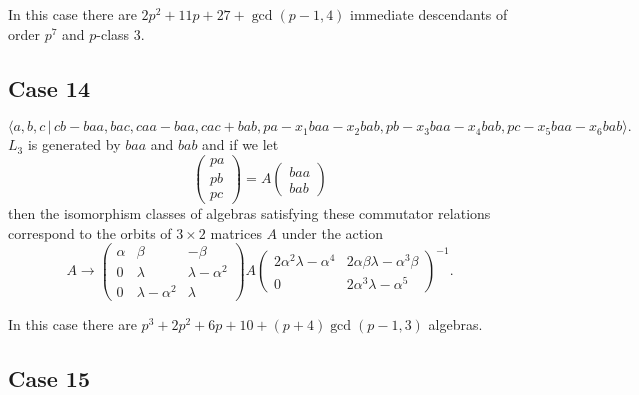 \documentclass[10pt,thmsa]{article}
\begin{document}
In this case there are $2p^{2}+11p+27+\gcd (p-1,4)$ immediate descendants of
order $p^{7}$ and $p$-class 3.

\subsection{Case 14}

\[
\langle
a,b,c\,|%
\,cb-baa,bac,caa-baa,cac+bab,pa-x_{1}baa-x_{2}bab,pb-x_{3}baa-x_{4}bab,pc-x_{5}baa-x_{6}bab\rangle . 
\]%
$L_{3}$ is generated by $baa$ and $bab$ and if we let 
\[
\left( 
\begin{array}{l}
pa \\ 
pb \\ 
pc%
\end{array}%
\right) =A\left( 
\begin{array}{l}
baa \\ 
bab%
\end{array}%
\right) 
\]%
then the isomorphism classes of algebras satisfying these commutator
relations correspond to the orbits of $3\times 2$ matrices $A$ under the
action 
\[
A\rightarrow \left( 
\begin{array}{lll}
\alpha & \beta & -\beta \\ 
0 & \lambda & \lambda -\alpha ^{2} \\ 
0 & \lambda -\alpha ^{2} & \lambda%
\end{array}%
\right) A\left( 
\begin{array}{ll}
2\alpha ^{2}\lambda -\alpha ^{4} & 2\alpha \beta \lambda -\alpha ^{3}\beta
\\ 
0 & 2\alpha ^{3}\lambda -\alpha ^{5}%
\end{array}%
\right) ^{-1}. 
\]%
$\allowbreak \allowbreak $

In this case there are $p^{3}+2p^{2}+6p+10+(p+4)\gcd (p-1,3)$ algebras.

\subsection{Case 15}
\end{document}

